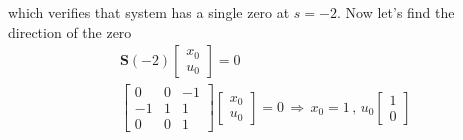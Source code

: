 \documentclass[twoside]{article}
\begin{document}
%
which verifies that system has a single zero at $s = -2$. Now let's find the direction of the zero 
%
\begin{align*}
&\mathbf{S}(-2) \left[ \begin{array}{c} x_0 \\ u_0 \end{array} \right] = 0
\\
&\left[ \begin{array}{ccc} 0 & 0 & - 1 \\ -1 & 1 & 1 \\ 0 & 0 & 1 \end{array} \right] \left[ \begin{array}{c} x_0 \\ \hline u_0 \end{array} \right] = 0 \, \Rightarrow \, x_0 = 1 \, , \, u_0 
 \left[ \begin{array}{c} 1 \\  0 \end{array} \right] 
\end{align*}
%

\end{document}
